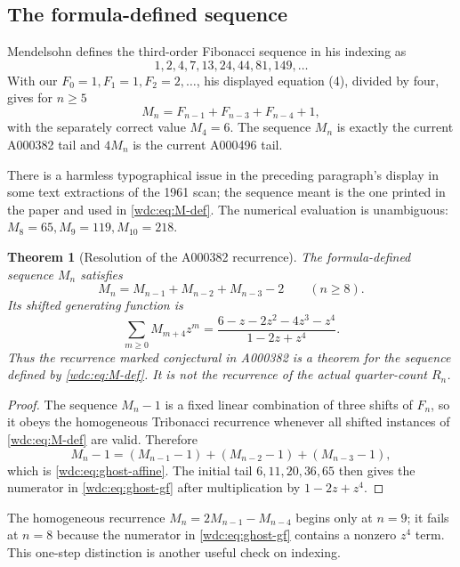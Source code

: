 \documentclass[11pt,letterpaper]{article}
\numberwithin{equation}{section}
\newtheorem{theorem}{Theorem}[section]
\theoremstyle{definition}
\begin{document}
\subsection{The formula-defined sequence}

Mendelsohn defines the third-order Fibonacci sequence in his indexing as
\[
  1,2,4,7,13,24,44,81,149,\dots
\]
With our
$F_0=1,F_1=1,F_2=2,\dots$, his displayed equation (4), divided by four, gives
for $n\ge5$
\begin{equation}\label{wdc:eq:M-def}
  M_n=F_{n-1}+F_{n-3}+F_{n-4}+1,
\end{equation}
with the separately correct value $M_4=6$.  The sequence $M_n$ is exactly the
current A000382 tail and $4M_n$ is the current A000496 tail.

There is a harmless typographical issue in the preceding paragraph's display
in some text extractions of the 1961 scan; the sequence meant is the one
printed in the paper and used in \eqref{wdc:eq:M-def}.  The numerical evaluation
is unambiguous: $M_8=65,M_9=119,M_{10}=218$.

\begin{theorem}[Resolution of the A000382 recurrence]\label{wdc:thm:ghost-recurrence}
The formula-defined sequence $M_n$ satisfies
\begin{equation}\label{wdc:eq:ghost-affine}
  \boxed{M_n=M_{n-1}+M_{n-2}+M_{n-3}-2}
  \qquad(n\ge8).
\end{equation}
Its shifted generating function is
\begin{equation}\label{wdc:eq:ghost-gf}
  \boxed{
  \sum_{m\ge0}M_{m+4}z^m
  =\frac{6-z-2z^2-4z^3-z^4}{1-2z+z^4}.}
\end{equation}
Thus the recurrence marked conjectural in A000382 is a theorem for the
sequence defined by \eqref{wdc:eq:M-def}.  It is not the recurrence of the actual
quarter-count $R_n$.
\end{theorem}

\begin{proof}
The sequence $M_n-1$ is a fixed linear combination of three shifts of $F_n$,
so it obeys the homogeneous Tribonacci recurrence whenever all shifted
instances of \eqref{wdc:eq:M-def} are valid.  Therefore
\[
 M_n-1=(M_{n-1}-1)+(M_{n-2}-1)+(M_{n-3}-1),
\]
which is \eqref{wdc:eq:ghost-affine}.  The initial tail
$6,11,20,36,65$ then gives the numerator in \eqref{wdc:eq:ghost-gf} after
multiplication by $1-2z+z^4$.
\end{proof}

The homogeneous recurrence $M_n=2M_{n-1}-M_{n-4}$ begins only at $n=9$;
it fails at $n=8$ because the numerator in \eqref{wdc:eq:ghost-gf} contains a
nonzero $z^4$ term.  This one-step distinction is another useful check on
indexing.
\end{document}
